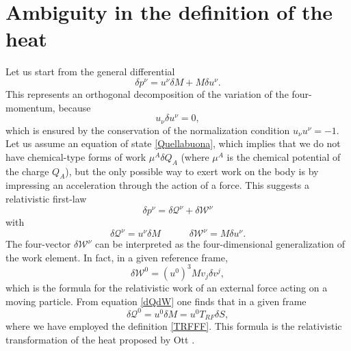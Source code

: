 \documentclass[twocolumn,usenatbib]{mnras2}
\newcommand{\spc}{\quad \quad \quad}
\begin{document}
\section{Ambiguity in the definition of the heat}\label{Calormio}

Let us start from the general differential
\begin{equation}\label{dividotutto}
\delta p^\nu = u^\nu \delta M + M \delta u^\nu.
\end{equation}
This represents an orthogonal decomposition of the variation of the four-momentum, because
\begin{equation}
u_{\nu} \delta u^\nu =0, 
\end{equation}
which is ensured by the conservation of the normalization condition $u_\nu u^\nu =-1$. Let us assume an equation of state \eqref{Quellabuona}, which implies that we do not have chemical-type forms of work $\mu^A \delta Q_A$ (where $\mu^A$ is the chemical potential of the charge $Q_A$), but the only possible way to exert work on the body is by impressing an acceleration through the action of a force. This suggests a relativistic first-law
\begin{equation}\label{dnvoekmcow}
\delta p^\nu = \delta \mathcal{Q}^\nu + \delta \mathcal{W}^\nu
\end{equation}
with
\begin{equation}\label{dQdW}
\delta \mathcal{Q}^\nu = u^\nu \delta M  \spc \delta \mathcal{W}^\nu = M \delta u^\nu.
\end{equation}
The four-vector $\delta \mathcal{W}^\nu$ can be interpreted as the four-dimensional generalization of the work element. In fact, in a given reference frame, 
\begin{equation}\label{W1O}
\delta \mathcal{W}^0 =(u^0)^3 M v_j \delta v^j,
\end{equation}
which is the formula for the relativistic work of an external force acting on a moving particle. From equation \eqref{dQdW} one finds that in a given frame
\begin{equation}
\delta \mathcal{Q}^0 =u^0 \delta M= u^0 T_{RF} \delta S,
\end{equation} 
where we have employed the definition \eqref{TRFFF}. This formula is the relativistic transformation of the heat proposed by Ott \citep{Pinto2017}.
\end{document}
